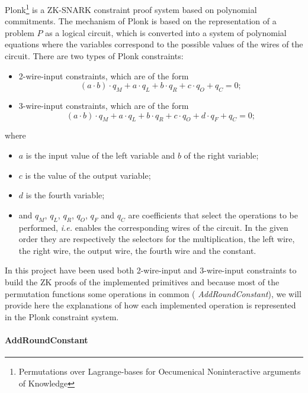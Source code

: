 \documentclass[12pt, a4paper]{report}
\begin{document}
\textsf{Plonk}\footnote{Permutations over Lagrange-bases for Oecumenical Noninteractive arguments of Knowledge} is a ZK-SNARK constraint proof system based on polynomial commitments.
The mechanism of \textsf{Plonk} is based on the representation of a problem $P$ as a logical circuit, which is converted into a system of polynomial equations where the variables correspond to the possible values of the wires of the circuit.
There are two types of \textsf{Plonk} constraints:
\begin{itemize}
  \item 2-wire-input constraints, which are of the form
    \begin{equation}
      (a \cdot b) \cdot q_M + a \cdot q_L + b \cdot q_R + c \cdot q_O + q_C = 0 ;
      \label{eq:2inconstraint}
    \end{equation}
  \item 3-wire-input constraints, which are of the form
    \begin{equation}
      (a \cdot b) \cdot q_M + a \cdot q_L + b \cdot q_R + c \cdot q_O + d \cdot q_F + q_C = 0 ;
      \label{eq:2inconstraint}
    \end{equation}
\end{itemize}
where
\begin{itemize}
  \item $a$ is the input value of the left variable and $b$ of the right variable;
  \item $c$ is the value of the output variable;
  \item $d$ is the fourth variable;
  \item and $q_M$, $q_L$, $q_R$, $q_O$, $q_F$ and $q_C$ are coefficients that select the operations to be performed, \textsl{i.e.} enables the corresponding wires of the circuit. In the given order they are respectively the selectors for the multiplication, the left wire, the right wire, the output wire, the fourth wire and the constant.
\end{itemize}
In this project have been used both 2-wire-input and 3-wire-input constraints to build the ZK proofs of the implemented primitives and because most of the permutation functions some operations in common ( \textit{AddRoundConstant}), we will provide here the explanations of how each implemented operation is represented in the \textsf{Plonk} constraint system.

\paragraph{AddRoundConstant}\label{par:arc}
\end{document}
